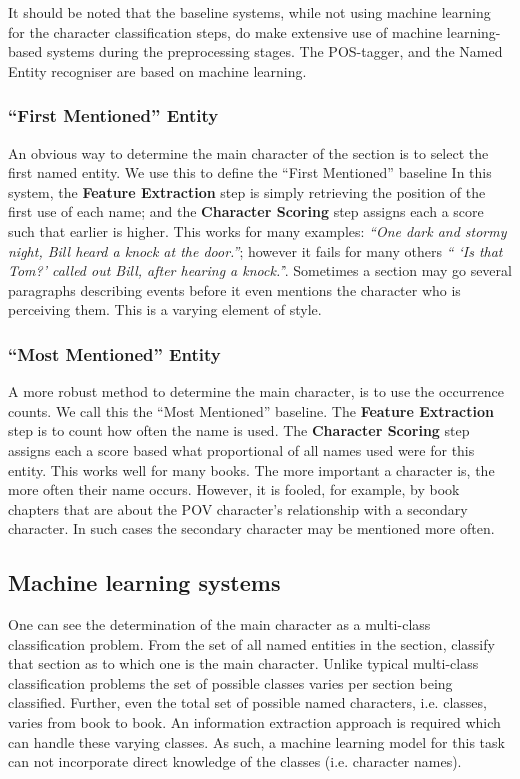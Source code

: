 \documentclass[11pt,a4paper]{article}
\begin{document}
It should be noted that the baseline systems, while not using machine learning for the  character classification steps, do make extensive use of machine learning-based systems during the preprocessing stages.
The POS-tagger, and the Named Entity recogniser are based on machine learning.

\subsubsection{``First Mentioned'' Entity}
An obvious way to determine the main character of the section is to select the first named entity.
We use this to define the ``First Mentioned'' baseline
In this system, the \textbf{Feature Extraction} step is simply retrieving the position of the first use of each name;
and the \textbf{Character Scoring} step assigns each a score such that earlier is higher.
This works for many examples: \emph{``One dark and stormy night, Bill heard a knock at the door.''};
however it fails for many others \emph{`` `Is that Tom?' called out Bill, after hearing a knock.'}'.
Sometimes a section  may go several paragraphs describing events before it even mentions the character who is perceiving them.
This is a varying element of style.

\subsubsection{``Most Mentioned'' Entity}
A more robust method to determine the main character, is to use the occurrence counts.
We call this the ``Most Mentioned'' baseline.
The \textbf{Feature Extraction} step is to count how often the name is used.
The \textbf{Character Scoring} step assigns each a score based what proportional of all names used were for this entity.
This works well for many books.
The more important a character is, the more often their name occurs.
However, it is fooled, for example, by book chapters that are about the POV character's relationship with a secondary character.
In such cases the secondary character may be mentioned more often.

\subsection{Machine learning systems}
One can see the determination of the main character as a multi-class classification problem.
From the set of all named entities in the section, classify that section as to which one is the main character.
Unlike typical multi-class classification problems
the set of possible classes varies per section being classified.
Further, even the total set of possible named characters, i.e.  classes, varies from book to book.
An information extraction approach is required which can handle these varying classes.
As such, a machine learning model for this task can not incorporate direct knowledge of the classes (i.e. character names).
\end{document}
